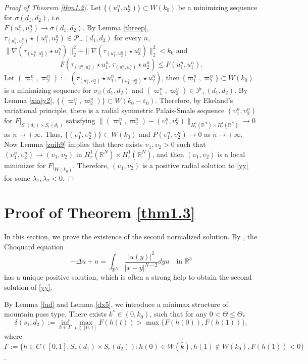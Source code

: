 \documentclass[reqno]{amsart}
\begin{document}
\begin{proof}[Proof of Theorem \ref{thm1.2}]
Let $\{(u_1^n,u_2^n)\}\subset W(k_0)$ be a minimizing sequence for
$\sigma(d_1,d_2)$, i.e.\\ $F(u_1^n,u_2^n)\to \sigma(d_1,d_2)$. 
By Lemma \ref{threep}, $\tau_{(u_1^n,u_2^n)}\star(u_1^n,u_2^n)
\in\mathcal{P}_+(d_1,d_2)$ for every $n$, 
$\| \nabla(\tau_{(u_1^n,u_2^n)}\star u_1^n)
\|_2^2+\| \nabla(\tau_{(u_1^n,u_2^n)}\star u_2^n)\|_2^2<k_0$ and
\[
F(\tau_{(u_1^n,u_2^n)}\star u_1^n,\tau_{(u_1^n,u_2^n)}\star u_2^n)\leq F(u_1^n,u_1^n).
\]
Let $(\varpi_1^n,\varpi_2^n):=(\tau_{(u_1^n,u_2^n)}\star u_1^n,\tau_{(u_1^n,u_2^n)}
\star u_2^n)$, then $\{\varpi_1^n,\varpi_2^n\}\subset W(k_0)$ is a minimizing
sequence for $\sigma_{\beta}(d_1,d_2)$ and
$(\varpi_1^n,\varpi_2^n)\in\mathcal{P}_+(d_1,d_2)$. By Lemma \ref{xiajy2},
$\{(\varpi_1^n,\varpi_2^n)\}\subset W(k_0-\varepsilon_0)$.
Therefore, by Ekeland's variational principle, there is a radial symmetric
Palais-Smale sequence $(\upsilon_1^n,\upsilon_2^n)$ for $F|_{S_r(d_1)\times S_r(d_1)}$
satisfying
$\| (\varpi_1^n,\varpi_2^n)-(\upsilon_1^n,\upsilon_2^n)
\|_{H_r^1(\mathbb{R}^N)\times H_r^1(\mathbb{R}^N)}\to 0$ as
$n\to +\infty$. Thus, $\{(\upsilon_1^n,\upsilon_2^n)\}\subset W(k_0)$ and
$P(\upsilon_1^n,\upsilon_2^n)\to 0$ as $n\to +\infty$.
Now Lemma \ref{zuih9} implies that
there exists $\upsilon_1,\upsilon_2>0$ such that
$(\upsilon_1^n,\upsilon_2^n)\to  (\upsilon_1,\upsilon_2)$ in
$H_r^1(\mathbb{R}^N)\times H_r^1(\mathbb{R}^N)$, and then
$(\upsilon_1,\upsilon_2)$ is a local minimizer for $F|_{W(k_0)}$.
Therefore, $(\upsilon_1,\upsilon_2)$ is a positive radial solution to \eqref{yy}
for some $\lambda_1,\lambda_2<0$.
\end{proof}

\section{Proof of Theorem \ref{thm1.3}}

In this section, we prove the existence of the second normalized solution. 
By \cite{Wyu}, the  Choquard equation
\begin{equation}\label{Wmc4}
-\Delta u+u=\int_{\mathbb{R}^N}\frac{|u(y)|^2}{|x-y|^{N-2}}dyu  \quad    \text{in } 
  \mathbb{R}^3
\end{equation}
has a unique positive solution, which is often a strong help to obtain the second 
solution of \eqref{yy}.

By Lemma \ref{fud} and Lemma \ref{dx5}, we introduce a minimax structure of
 mountain pass type. There exists
$k^*\in(0,k_0)$, such that for any $0<\Theta\leq\Theta_*$
\[
\delta(s_1,d_2):=\inf_{h\in\Gamma}\max_{t\in[0,1]}F(h(t))
>\max\{F(h(0)),F(h(1))\},
\]
where $\Gamma:=\{h\in C([0,1],S_r(d_1)\times S_r(d_2)):h(0)
\in W(\bar{k}),h(1)\notin\overline{W(k_0)},F(h(1))<0\}$.
\end{document}
